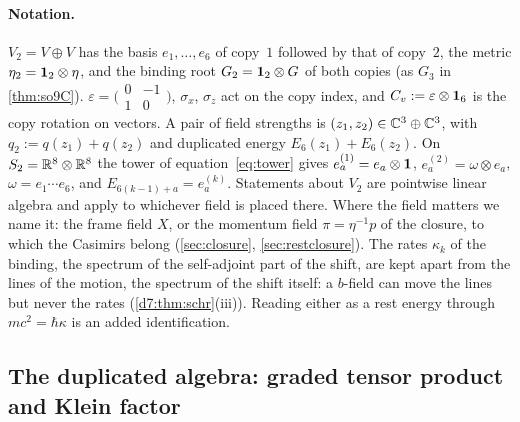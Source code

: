\paragraph{Notation.} $V_2=V\oplus V$ has the basis $e_1,\dots,e_6$ of copy~$1$ followed by that of copy~$2$, the metric
$\eta_2=\mathbf 1_2\otimes\eta$, and the binding root $G_2=\mathbf 1_2\otimes G$ of both copies (as $G_3$ in \cref{thm:so9C}).
$\varepsilon=\bigl(\begin{smallmatrix}0&-1\\1&0\end{smallmatrix}\bigr)$, $\sigma_x$, $\sigma_z$ act on the copy index, and
$C_v:=\varepsilon\otimes\mathbf 1_6$ is the copy rotation on vectors. A pair of field strengths is $(z_1,z_2)\in\mathbb{C}^3\oplus\mathbb{C}^3$, with
$q_2:=q(z_1)+q(z_2)$ and duplicated energy $E_6(z_1)+E_6(z_2)$. On $S_2=\mathbb{R}^8\otimes\mathbb{R}^8$ the tower of equation~\cref{eq:tower} gives
$e^{(1)}_a=e_a\otimes\mathbf 1$, $e^{(2)}_a=\omega\otimes e_a$, $\omega=e_1\cdots e_6$, and $E_{6(k-1)+a}=e^{(k)}_a$. Statements about $V_2$ are
pointwise linear algebra and apply to whichever field is placed there. Where the field matters we name it: the frame field $X$, or the
momentum field $\pi=\eta^{-1}p$ of the closure, to which the Casimirs belong (\cref{sec:closure}, \cref{sec:restclosure}). The
rates $\kappa_k$ of the binding, the spectrum of the self-adjoint part of the shift, are kept apart from the lines of the motion, the
spectrum of the shift itself: a $b$-field can move the lines but never the rates (\cref{d7:thm:schr}(iii)). Reading either as a rest energy through
$mc^2=\hbar\kappa$ is an added identification.

\subsection{The duplicated algebra: graded tensor product and Klein factor}
\label{d5:sec:algebra}

